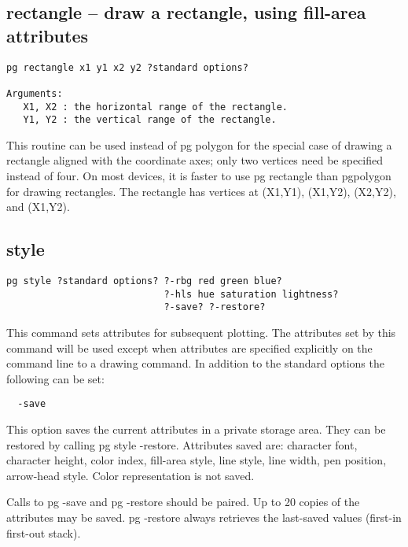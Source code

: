 \subsection{rectangle -- draw a rectangle, using fill-area attributes}
\begin{verbatim}
pg rectangle x1 y1 x2 y2 ?standard options?

Arguments:
   X1, X2 : the horizontal range of the rectangle.
   Y1, Y2 : the vertical range of the rectangle.
\end{verbatim}
This routine can be used instead of pg polygon for the special case of
drawing a rectangle aligned with the coordinate axes; only two
vertices need be specified instead of four.  On most devices, it is
faster to use pg rectangle than pgpolygon for drawing rectangles.  The
rectangle has vertices at (X1,Y1), (X1,Y2), (X2,Y2), and (X1,Y2).


\subsection{style}
\begin{verbatim}
pg style ?standard options? ?-rbg red green blue? 
                            ?-hls hue saturation lightness?
                            ?-save? ?-restore?
\end{verbatim}

This command sets attributes for subsequent plotting.  The
attributes set by this command will be used except when attributes
are specified explicitly on the command line to a drawing command.
In addition to the standard options the following can be set:
\begin{verbatim}
  -save
\end{verbatim}
This option saves the current attributes in a private storage
area. They can be restored by calling pg style -restore. Attributes
saved are: character font, character height, color index, fill-area
style, line style, line width, pen position, arrow-head style.
Color representation is not saved.

Calls to pg -save and pg -restore should be paired. Up to 20 copies
of the attributes may be saved. pg -restore always retrieves the last-saved
values (first-in first-out stack).

